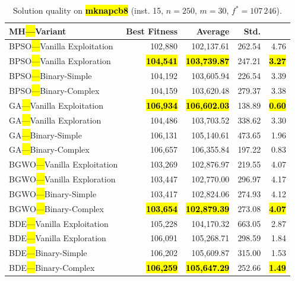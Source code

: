 \documentclass[mathematics,article,accept,moreauthors]{Definitions/mdpi}
\begin{document}
\begin{table}[H]
  \small
  \caption{Solution quality on \textbf{\hl{mknapcb8}} (inst. 15, $n=250$, $m=30$, $f^*=107\,246$).}
  \label{tab:calidad_mknapcb8_15}
  \begin{tabularx}{\textwidth}{lRRRR}
    \toprule
    \textbf{MH\hl{---}Variant} &
    \textbf{Best Fitness} &
    \textbf{Average} &
    \textbf{Std.} &
    \textbf{} \\
    \midrule
    BPSO\hl{---}Vanilla Exploitation &         102,880 &        102,137.61 & 262.54 &         4.76 \\
    BPSO\hl{---}Vanilla Exploration  & \textbf{\hl{104,541}} & \textbf{\hl{103,739.87}} & 247.21 & \textbf{\hl{3.27}} \\
    BPSO\hl{---}Binary-Simple        &         104,192 &        103,605.94 & 226.54 &         3.39 \\
    BPSO\hl{---}Binary-Complex       &         104,159 &        103,620.48 & 279.37 &         3.38 \\
    \midrule
    GA\hl{---}Vanilla Exploitation   & \textbf{\hl{106,934}} & \textbf{\hl{106,602.03}} & 138.89 & \textbf{\hl{0.60}} \\
    GA\hl{---}Vanilla Exploration    &         104,486 &        103,703.52 & 338.62 &         3.30 \\
    GA\hl{---}Binary-Simple          &         106,131 &        105,140.61 & 473.65 &         1.96 \\
    GA\hl{---}Binary-Complex         &         106,657 &        106,355.84 & 197.22 &         0.83 \\
    \midrule
    BGWO\hl{---}Vanilla Exploitation &         103,269 &        102,876.97 & 219.55 &         4.07 \\
    BGWO\hl{---}Vanilla Exploration  &         103,447 &        102,770.00 & 296.97 &         4.17 \\
    BGWO\hl{---}Binary-Simple        &         103,417 &        102,824.06 & 274.93 &         4.12 \\
    BGWO\hl{---}Binary-Complex       & \textbf{\hl{103,654}} & \textbf{\hl{102,879.39}} & 273.08 & \textbf{\hl{4.07}} \\
    \midrule
    BDE\hl{---}Vanilla Exploitation  &         105,228 &        104,170.32 & 663.05 &         2.87 \\
    BDE\hl{---}Vanilla Exploration   &         106,091 &        105,268.71 & 298.59 &         1.84 \\
    BDE\hl{---}Binary-Simple         &         106,202 &        105,609.87 & 315.00 &         1.53 \\
    BDE\hl{---}Binary-Complex        & \textbf{\hl{106,259}} & \textbf{\hl{105,647.29}} & 252.66 & \textbf{\hl{1.49}} \\
    \bottomrule
  \end{tabularx}
\end{table}
\end{document}
